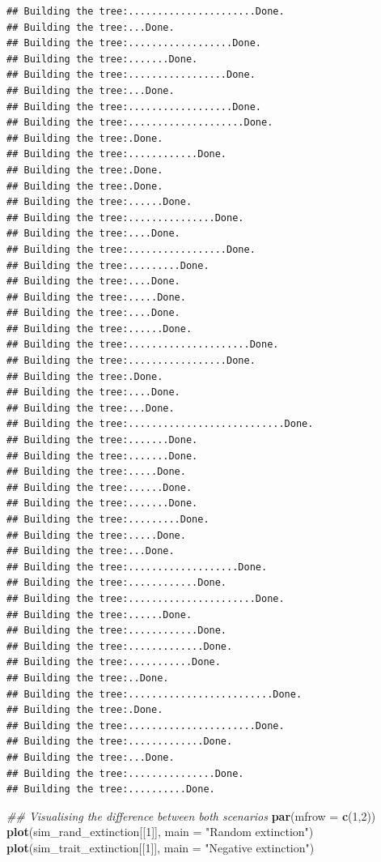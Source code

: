 \documentclass[
]{book}
\newenvironment{Shaded}{\begin{snugshade}}{\end{snugshade}}
\newcommand{\CommentTok}[1]{\textcolor[rgb]{0.56,0.35,0.01}{\textit{#1}}}
\newcommand{\DataTypeTok}[1]{\textcolor[rgb]{0.13,0.29,0.53}{#1}}
\newcommand{\DecValTok}[1]{\textcolor[rgb]{0.00,0.00,0.81}{#1}}
\newcommand{\KeywordTok}[1]{\textcolor[rgb]{0.13,0.29,0.53}{\textbf{#1}}}
\newcommand{\NormalTok}[1]{#1}
\newcommand{\StringTok}[1]{\textcolor[rgb]{0.31,0.60,0.02}{#1}}
\begin{document}
\begin{verbatim}
## Building the tree:......................Done.
## Building the tree:...Done.
## Building the tree:..................Done.
## Building the tree:.......Done.
## Building the tree:.................Done.
## Building the tree:...Done.
## Building the tree:..................Done.
## Building the tree:....................Done.
## Building the tree:.Done.
## Building the tree:............Done.
## Building the tree:.Done.
## Building the tree:.Done.
## Building the tree:......Done.
## Building the tree:...............Done.
## Building the tree:....Done.
## Building the tree:.................Done.
## Building the tree:.........Done.
## Building the tree:....Done.
## Building the tree:.....Done.
## Building the tree:....Done.
## Building the tree:......Done.
## Building the tree:.....................Done.
## Building the tree:.................Done.
## Building the tree:.Done.
## Building the tree:....Done.
## Building the tree:...Done.
## Building the tree:...........................Done.
## Building the tree:.......Done.
## Building the tree:.......Done.
## Building the tree:.....Done.
## Building the tree:......Done.
## Building the tree:.......Done.
## Building the tree:.........Done.
## Building the tree:.....Done.
## Building the tree:...Done.
## Building the tree:...................Done.
## Building the tree:............Done.
## Building the tree:......................Done.
## Building the tree:......Done.
## Building the tree:............Done.
## Building the tree:.............Done.
## Building the tree:...........Done.
## Building the tree:..Done.
## Building the tree:.........................Done.
## Building the tree:.Done.
## Building the tree:......................Done.
## Building the tree:.............Done.
## Building the tree:...Done.
## Building the tree:...............Done.
## Building the tree:..........Done.
\end{verbatim}

\begin{Shaded}
\begin{Highlighting}[]
\CommentTok{\#\# Visualising the difference between both scenarios}
\KeywordTok{par}\NormalTok{(}\DataTypeTok{mfrow =} \KeywordTok{c}\NormalTok{(}\DecValTok{1}\NormalTok{,}\DecValTok{2}\NormalTok{))}
\KeywordTok{plot}\NormalTok{(sim\_rand\_extinction[[}\DecValTok{1}\NormalTok{]], }\DataTypeTok{main =} \StringTok{"Random extinction"}\NormalTok{)}
\KeywordTok{plot}\NormalTok{(sim\_trait\_extinction[[}\DecValTok{1}\NormalTok{]], }\DataTypeTok{main =} \StringTok{"Negative extinction"}\NormalTok{)}
\end{Highlighting}
\end{Shaded}
\end{document}
